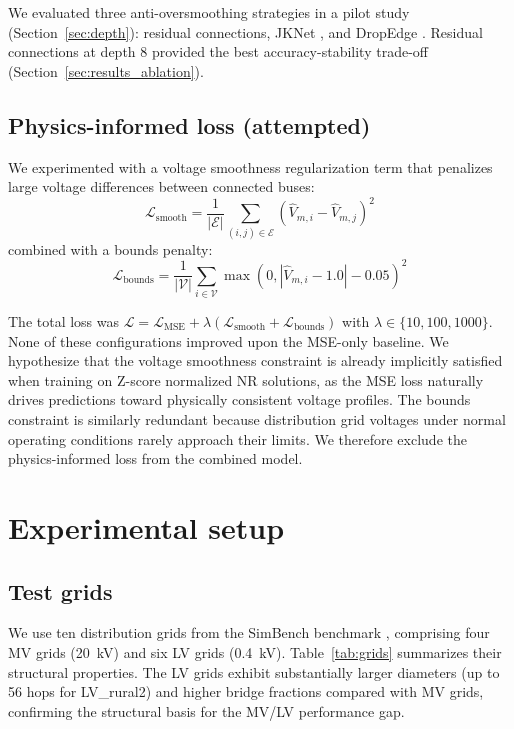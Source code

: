 \documentclass[preprint,review,12pt]{elsarticle}
\begin{document}
We evaluated three anti-oversmoothing strategies in a pilot study (Section~\ref{sec:depth}): residual connections, JKNet \cite{b18}, and DropEdge \cite{b19}. Residual connections at depth 8 provided the best accuracy-stability trade-off (Section~\ref{sec:results_ablation}).

\subsection{Physics-informed loss (attempted)}

We experimented with a voltage smoothness regularization term that penalizes large voltage differences between connected buses:
\begin{equation}
\mathcal{L}_{\text{smooth}} = \frac{1}{|\mathcal{E}|} \sum_{(i,j) \in \mathcal{E}} \left(\hat{V}_{m,i} - \hat{V}_{m,j}\right)^2
\label{eq:smooth}
\end{equation}
combined with a bounds penalty:
\begin{equation}
\mathcal{L}_{\text{bounds}} = \frac{1}{|\mathcal{V}|} \sum_{i \in \mathcal{V}} \max\!\left(0, |\hat{V}_{m,i} - 1.0| - 0.05\right)^2
\label{eq:bounds}
\end{equation}

The total loss was $\mathcal{L} = \mathcal{L}_{\text{MSE}} + \lambda (\mathcal{L}_{\text{smooth}} + \mathcal{L}_{\text{bounds}})$ with $\lambda \in \{10, 100, 1000\}$. None of these configurations improved upon the MSE-only baseline. We hypothesize that the voltage smoothness constraint is already implicitly satisfied when training on Z-score normalized NR solutions, as the MSE loss naturally drives predictions toward physically consistent voltage profiles. The bounds constraint is similarly redundant because distribution grid voltages under normal operating conditions rarely approach their limits. We therefore exclude the physics-informed loss from the combined model.

\section{Experimental setup}
\label{sec:setup}

\subsection{Test grids}

We use ten distribution grids from the SimBench benchmark \cite{b23}, comprising four MV grids (20~kV) and six LV grids (0.4~kV). Table~\ref{tab:grids} summarizes their structural properties. The LV grids exhibit substantially larger diameters (up to 56 hops for LV\_rural2) and higher bridge fractions compared with MV grids, confirming the structural basis for the MV/LV performance gap.
\end{document}
